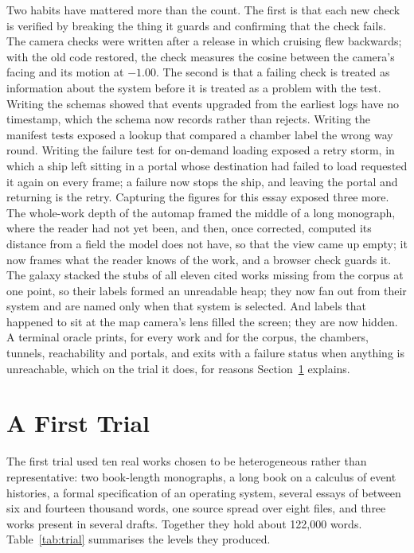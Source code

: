 \documentclass[11pt]{article}
\theoremstyle{remark}
\begin{document}
Two habits have mattered more than the count. The first is that each new check is verified by breaking the thing it guards and confirming that the check fails. The camera checks were written after a release in which cruising flew backwards; with the old code restored, the check measures the cosine between the camera's facing and its motion at $-1.00$. The second is that a failing check is treated as information about the system before it is treated as a problem with the test. Writing the schemas showed that events upgraded from the earliest logs have no timestamp, which the schema now records rather than rejects. Writing the manifest tests exposed a lookup that compared a chamber label the wrong way round. Writing the failure test for on-demand loading exposed a retry storm, in which a ship left sitting in a portal whose destination had failed to load requested it again on every frame; a failure now stops the ship, and leaving the portal and returning is the retry. Capturing the figures for this essay exposed three more. The whole-work depth of the automap framed the middle of a long monograph, where the reader had not yet been, and then, once corrected, computed its distance from a field the model does not have, so that the view came up empty; it now frames what the reader knows of the work, and a browser check guards it. The galaxy stacked the stubs of all eleven cited works missing from the corpus at one point, so their labels formed an unreadable heap; they now fan out from their system and are named only when that system is selected. And labels that happened to sit at the map camera's lens filled the screen; they are now hidden. A terminal oracle prints, for every work and for the corpus, the chambers, tunnels, reachability and portals, and exits with a failure status when anything is unreachable, which on the trial it does, for reasons Section~\ref{sec:trial} explains.

\section{A First Trial}
\label{sec:trial}

The first trial used ten real works chosen to be heterogeneous rather than representative: two book-length monographs, a long book on a calculus of event histories, a formal specification of an operating system, several essays of between six and fourteen thousand words, one source spread over eight files, and three works present in several drafts. Together they hold about 122,000 words. Table~\ref{tab:trial} summarises the levels they produced.
\end{document}
